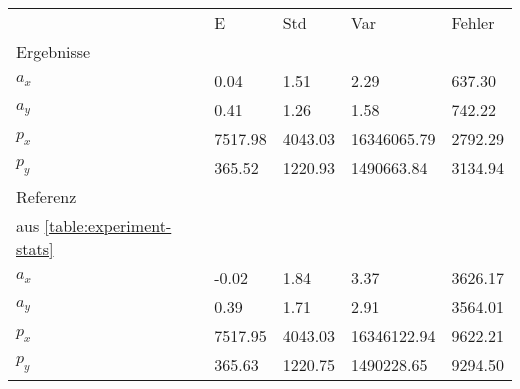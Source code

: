 \begin{tabular}{l|l|l|l|l}

     & E   & Std    & Var    & Fehler \\
\hhline{=|=|=|=|=}

Ergebnisse & & & & \\
$a_x$  &         0.04 &         1.51 &         2.29 &       637.30 \\
$a_y$  &         0.41 &         1.26 &         1.58 &       742.22 \\
$p_x$  &      7517.98 &      4043.03 &  16346065.79 &      2792.29 \\
$p_y$  &       365.52 &      1220.93 &   1490663.84 &      3134.94 \\

\hline
Referenz & & & & \\
aus \ref{table:experiment-stats} & & & & \\
$a_x$  &        -0.02 &         1.84 &         3.37 &      3626.17 \\
$a_y$  &         0.39 &         1.71 &         2.91 &      3564.01 \\
$p_x$  &      7517.95 &      4043.03 &  16346122.94 &      9622.21 \\
$p_y$  &       365.63 &      1220.75 &   1490228.65 &      9294.50 \\
\end{tabular}
